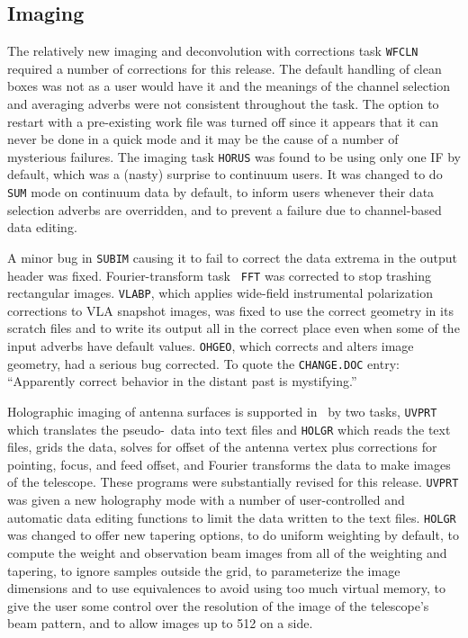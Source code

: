 \vfill\eject
\subsection{Imaging}

The relatively new imaging and deconvolution with corrections task
{\tt WFCLN} required a number of corrections for this release.  The
default handling of clean boxes was not as a user would have it and
the meanings of the channel selection and averaging adverbs were not
consistent throughout the task.  The option to restart with a
pre-existing work file was turned off since it appears that it can
never be done in a quick mode and it may be the cause of a number of
mysterious failures.  The imaging task {\tt HORUS} was found to be
using only one IF by default, which was a (nasty) surprise to continuum
users.  It was changed to do {\tt SUM} mode on continuum data by
default, to inform users whenever their data selection adverbs are
overridden, and to prevent a failure due to channel-based data
editing.

A minor bug in {\tt SUBIM} causing it to fail to correct the data
extrema in the output header was fixed.  Fourier-transform task {\tt
FFT} was corrected to stop trashing rectangular images.  {\tt VLABP},
which applies wide-field instrumental polarization corrections to VLA
snapshot images, was fixed to use the correct geometry in its scratch
files and to write its output all in the correct place even when some
of the input adverbs have default values.  {\tt OHGEO}, which corrects
and alters image geometry, had a serious bug corrected.  To quote the
{\tt CHANGE.DOC} entry: ``Apparently correct behavior in the distant
past is mystifying.''

Holographic imaging of antenna surfaces is supported in \AIPS\ by two
tasks, {\tt UVPRT} which translates the pseudo-\uv\ data into text
files and {\tt HOLGR} which reads the text files, grids the data,
solves for offset of the antenna vertex plus corrections for pointing,
focus, and feed offset, and Fourier transforms the data to make images
of the telescope.  These programs were substantially revised for this
release.  {\tt UVPRT} was given a new holography mode with a number of
user-controlled and automatic data editing functions to limit the data
written to the text files.  {\tt HOLGR} was changed to offer new
tapering options, to do uniform weighting by default, to compute the
weight and observation beam images from all of the weighting and
tapering, to ignore samples outside the grid, to parameterize the
image dimensions and to use equivalences to avoid using too much
virtual memory, to give the user some control over the resolution of
the image of the telescope's beam pattern, and to allow images up to
512 on a side.

